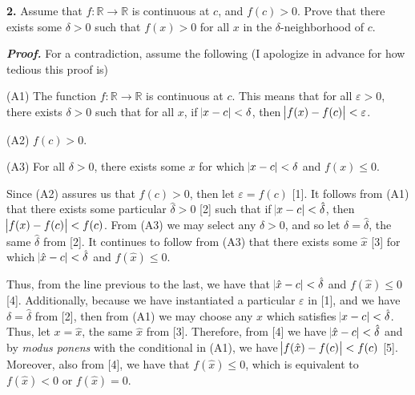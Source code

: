 \documentclass[12pt, a4paper]{article}
\begin{document}
\vspace{2mm}

\noindent\textbf{2. } Assume that $f\colon\mathbb{R}\rightarrow\mathbb{R}$ is continuous at $c$, and $f(c)>0$. Prove that there exists some $\delta>0$ such that $f(x)>0$ for all $x$ in the $\delta$-neighborhood of $c$.

\begin{description}
    \item\textit{\textbf{Proof.}} For a contradiction, assume the following (I apologize in advance for how tedious this proof is)
    
    \begin{description}
        \item(A1) The function $f\colon\mathbb{R}\rightarrow\mathbb{R}$ is continuous at $c$. This means that for all $\varepsilon>0$, there exists $\delta>0$ such that for all $x$, if $\abs{x-c}<\delta$, then $\abs{f(x)-f(c)}<\varepsilon$. 
        \item(A2) $f(c)>0$.
        \vspace{3mm}
        \item(A3) For all $\delta>0$, there exists some $x$ for which $\abs{x-c}<\delta$ and $f(x)\leq 0$.
    \end{description}
    
    \item Since (A2) assures us that $f(c)>0$, then let $\varepsilon=f(c)$ [1]. It follows from (A1) that there exists some particular $\hat{\delta}>0$  [2]  such that if $\abs{x-c}<\hat{\delta}$, then $\abs{f(x)-f(c)}<f(c)$. From (A3) we may select any $\delta>0$, and so let $\delta=\hat{\delta}$, the same $\hat{\delta}$ from [2]. It continues to follow from (A3) that there exists some $\hat{x}$ [3] for which $\abs{\hat{x}-c}<\hat{\delta}$ and $f(\hat{x})\leq 0$.\par
    \hspace{4.5mm}Thus, from the line previous to the last, we have that $\abs{\hat{x}-c}<\hat{\delta}$ and $f(\hat{x})\leq 0$ [4]. Additionally, because we have instantiated a particular $\varepsilon$ in [1], and we have $\delta=\hat{\delta}$ from [2], then from (A1) we may choose any $x$ which satisfies $\abs{x-c}<\hat{\delta}$. Thus, let $x=\hat{x}$, the same $\hat{x}$ from [3]. Therefore, from [4] we have $\abs{\hat{x}-c}<\hat{\delta}$ and by \textit{modus ponens} with the conditional in (A1), we have $\abs{f(\hat{x})-f(c)}<f(c)$ [5]. Moreover, also from [4], we have that $f(\hat{x})\leq 0$, which is equivalent to $f(\hat{x})<0$ or $f(\hat{x})=0$.
    

\end{description}
\end{document}
